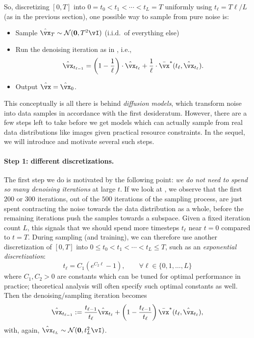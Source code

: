 \documentclass[../../book-main.tex]{subfiles}
\begin{document}
So, discretizing \([0, T]\) into \(0 = t_{0} < t_{1} < \cdots < t_{L} = T\) uniformly using \(t_{\ell} = T\ell / L\) (as in the previous section), one possible way to sample from pure noise is:
\begin{itemize}
	\item Sample \(\hat{\vx}_{T} \sim \dNorm(\vzero, T^{2}\vI)\) (i.i.d.~of everything else) 
	\item Run the denoising iteration as in , i.e.,
		\begin{equation}\label{eq:denoising-iteration-basic}
		\hat{\vx}_{t_{\ell - 1}} = \bp{1 - \frac{1}{\ell}}\cdot\hat{\vx}_{t_{\ell}} + \frac{1}{\ell}\cdot\bar{\vx}^{\ast}(t_{\ell}, \hat{\vx}_{t_{\ell}}).
	\end{equation}
	\item Output \(\hat{\vx} = \hat{\vx}_{0}\).
\end{itemize}
This conceptually is all there is behind \textit{diffusion models}, which transform noise into data samples in accordance with the first desideratum. However, there are a few steps left to take before we get models which can actually sample from real data distributions like images given practical resource constraints. In the sequel, we will introduce and motivate several such steps.

\paragraph{Step 1: different discretizations.} The first step we do is motivated by the following point: \textit{we do not need to spend so many denoising iterations} at large  \(t\). If we look at , we observe that the first \(200\) or \(300\) iterations, out of the \(500\) iterations of the sampling process, are just spent contracting the noise towards the data distribution as a whole, before the remaining iterations push the samples towards a subspace. Given a fixed iteration count \(L\), this signals that we should spend more timesteps \(t_{\ell}\) near \(t = 0\) compared to \(t = T\). During sampling (and training), we can therefore use another discretization of \([0, T]\) into \(0 \leq t_{0} < t_{1} < \cdots < t_{L} \leq T\), such as an \textit{exponential discretization}:
\begin{equation}\label{eq:denoising_exponential_discretization}
	t_{\ell} = C_{1}(e^{C_{2}\ell} - 1), \qquad \forall \ell \in \{0, 1, \dots, L\}
\end{equation}
where \(C_{1}, C_{2} > 0\) are constants which can be tuned for optimal performance in practice; theoretical analysis will often specify such optimal constants as well. Then the denoising/sampling iteration becomes 
\begin{equation}\label{eq:denoising_iteration}
	\hat{\vx}_{t_{\ell - 1}} := \frac{t_{\ell - 1}}{t_{\ell}}\hat{\vx}_{t_{\ell}} + \bp{1 - \frac{t_{\ell - 1}}{t_{\ell}}}\bar{\vx}^{\ast}(t_{\ell}, \hat{\vx}_{t_{\ell}}),
\end{equation}
with, again, \(\hat{\vx}_{t_{L}} \sim \dNorm(\vzero, t_{L}^{2}\vI)\).
\end{document}
